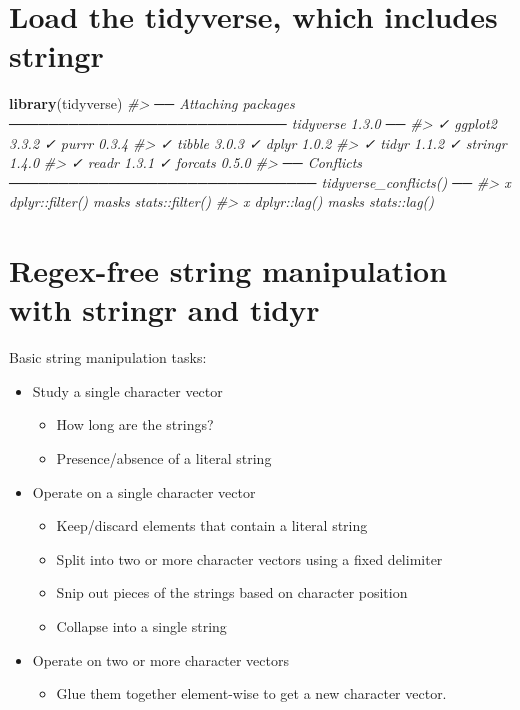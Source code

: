 \documentclass[
]{book}
\newenvironment{Shaded}{\begin{snugshade}}{\end{snugshade}}
\newcommand{\CommentTok}[1]{\textcolor[rgb]{0.56,0.35,0.01}{\textit{#1}}}
\newcommand{\KeywordTok}[1]{\textcolor[rgb]{0.13,0.29,0.53}{\textbf{#1}}}
\newcommand{\NormalTok}[1]{#1}
\providecommand{\tightlist}{%
  \setlength{\itemsep}{0pt}\setlength{\parskip}{0pt}}
\begin{document}
\hypertarget{load-the-tidyverse-which-includes-stringr}{%
\section{Load the tidyverse, which includes stringr}\label{load-the-tidyverse-which-includes-stringr}}

\begin{Shaded}
\begin{Highlighting}[]
\KeywordTok{library}\NormalTok{(tidyverse)}
\CommentTok{#> ── Attaching packages ──────────────────────────── tidyverse 1.3.0 ──}
\CommentTok{#> ✓ ggplot2 3.3.2     ✓ purrr   0.3.4}
\CommentTok{#> ✓ tibble  3.0.3     ✓ dplyr   1.0.2}
\CommentTok{#> ✓ tidyr   1.1.2     ✓ stringr 1.4.0}
\CommentTok{#> ✓ readr   1.3.1     ✓ forcats 0.5.0}
\CommentTok{#> ── Conflicts ─────────────────────────────── tidyverse_conflicts() ──}
\CommentTok{#> x dplyr::filter() masks stats::filter()}
\CommentTok{#> x dplyr::lag()    masks stats::lag()}
\end{Highlighting}
\end{Shaded}

\hypertarget{regex-free-string-manipulation-with-stringr-and-tidyr}{%
\section{Regex-free string manipulation with stringr and tidyr}\label{regex-free-string-manipulation-with-stringr-and-tidyr}}

Basic string manipulation tasks:

\begin{itemize}
\tightlist
\item
  Study a single character vector

  \begin{itemize}
  \tightlist
  \item
    How long are the strings?
  \item
    Presence/absence of a literal string
  \end{itemize}
\item
  Operate on a single character vector

  \begin{itemize}
  \tightlist
  \item
    Keep/discard elements that contain a literal string
  \item
    Split into two or more character vectors using a fixed delimiter\\
  \item
    Snip out pieces of the strings based on character position
  \item
    Collapse into a single string
  \end{itemize}
\item
  Operate on two or more character vectors

  \begin{itemize}
  \tightlist
  \item
    Glue them together element-wise to get a new character vector.
  \end{itemize}
\end{itemize}
\end{document}
